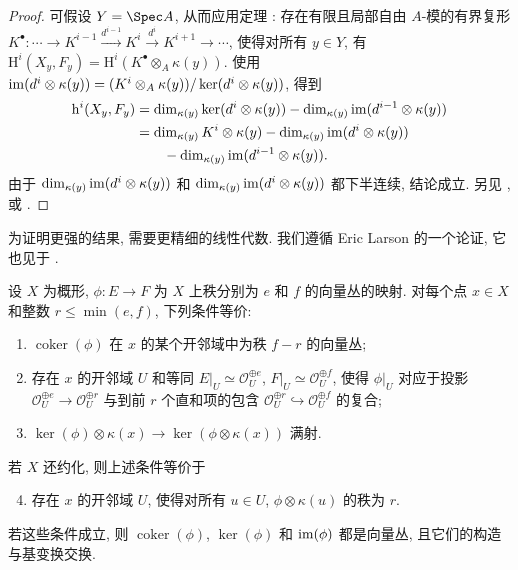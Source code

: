 \begin{proof}
可假设 $Y=\Spec A$, 从而应用定理 : 存在有限且局部自由 $A$-模的有界复形 $K^\bullet:\cdots\to K^{i-1}\xrightarrow{d^{i-1}}K^i\xrightarrow{d^i}K^{i+1}\to\cdots$, 使得对所有 $y\in Y$, 有 $\mathrm H^i(X_y,F_y)=\mathrm H^i(K^\bullet\otimes_A\kappa(y))$. 使用 $\operatorname{im}(d^i\otimes\kappa(y))=(K^i\otimes_A\kappa(y))/\ker(d^i\otimes\kappa(y))$, 得到
\begin{equation}\label{src:A.6.5}
\begin{aligned}
\mathrm h^i(X_y,F_y)&=\dim_{\kappa(y)}\ker(d^i\otimes\kappa(y))-\dim_{\kappa(y)}\operatorname{im}(d^{i-1}\otimes\kappa(y))\\
&=\dim_{\kappa(y)}K^i\otimes\kappa(y)-\dim_{\kappa(y)}\operatorname{im}(d^i\otimes\kappa(y))\\
&\qquad-\dim_{\kappa(y)}\operatorname{im}(d^{i-1}\otimes\kappa(y)).
\end{aligned}
\end{equation}
由于 $\dim_{\kappa(y)}\operatorname{im}(d^i\otimes\kappa(y))$ 和 $\dim_{\kappa(y)}\operatorname{im}(d^i\otimes\kappa(y))$ 都下半连续, 结论成立. 另见 \cite[第 $47$ 页]{Mum70a}, \cite[定理 $12.8$]{Har77} 或 \cite[定理 $25.1.1$]{Vak17}.
\end{proof}
为证明更强的结果, 需要更精细的线性代数. 我们遵循 Eric Larson 的一个论证, 它也见于 \cite[\S$25.2$]{Vak17}.
\begin{proposition}\label{src:A.6.6}
设 $X$ 为概形, $\phi:E\to F$ 为 $X$ 上秩分别为 $e$ 和 $f$ 的向量丛的映射. 对每个点 $x\in X$ 和整数 $r\leq\min(e,f)$, 下列条件等价:
\begin{enumerate}[(1)]
\item $\operatorname{coker}(\phi)$ 在 $x$ 的某个开邻域中为秩 $f-r$ 的向量丛;
\item 存在 $x$ 的开邻域 $U$ 和等同 $E|_U\simeq\mathcal O_U^{\oplus e}$, $F|_U\simeq\mathcal O_U^{\oplus f}$, 使得 $\phi|_U$ 对应于投影 $\mathcal O_U^{\oplus e}\to\mathcal O_U^{\oplus r}$ 与到前 $r$ 个直和项的包含 $\mathcal O_U^{\oplus r}\hookrightarrow\mathcal O_U^{\oplus f}$ 的复合;
\item $\ker(\phi)\otimes\kappa(x)\to\ker(\phi\otimes\kappa(x))$ 满射.
\end{enumerate}
若 $X$ 还约化, 则上述条件等价于
\begin{enumerate}[(1)]\setcounter{enumi}{3}
\item 存在 $x$ 的开邻域 $U$, 使得对所有 $u\in U$, $\phi\otimes\kappa(u)$ 的秩为 $r$.
\end{enumerate}
若这些条件成立, 则 $\operatorname{coker}(\phi)$, $\ker(\phi)$ 和 $\operatorname{im}(\phi)$ 都是向量丛, 且它们的构造与基变换交换.
\end{proposition}
